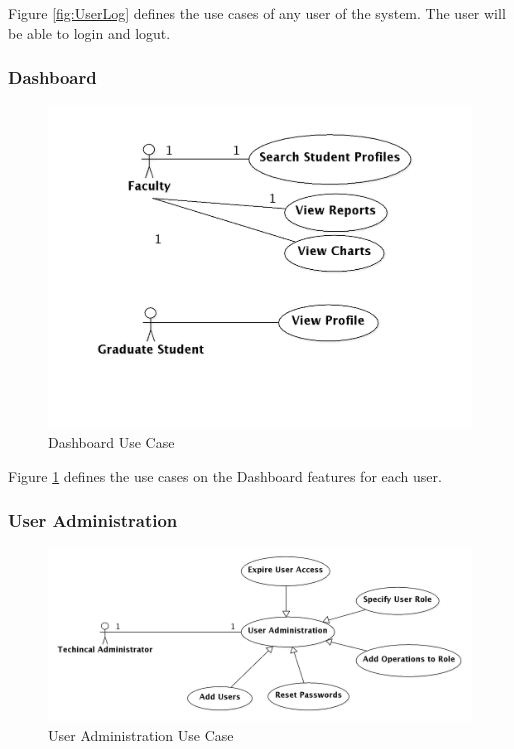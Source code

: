 \documentclass[11pt,a4paper]{report}
\begin{document}
Figure \ref{fig:UserLog} defines the use cases of any user of the system. The user will be able to login and logut.

\subsubsection{Dashboard}

\begin{figure}[htp]
\centering
\includegraphics[scale=0.25]{diagrams/use_cases/Dashboard_uc.png}
\caption{Dashboard Use Case}
\label{fig:Dashboard}
\end{figure}

Figure \ref{fig:Dashboard} defines the use cases on the Dashboard features for each user.

\subsubsection{User Administration}

\begin{figure}[htp]
\centering
\includegraphics[scale=0.25]{diagrams/use_cases/TechAdmin_uc.png}
\caption{User Administration Use Case}
\label{fig:UserAdmin}
\end{figure}
\end{document}
